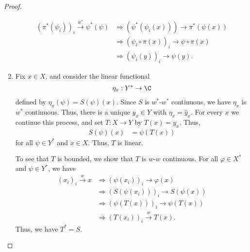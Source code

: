 \documentclass[10pt]{mypackage}
\begin{document}
\begin{proof}
\begin{enumerate}[(1)]
\begin{align*}
        \left(\pi^{\ast}\left(\psi_i\right)\right)_i \xrightarrow{w^{\ast}}\psi^{\ast}\left(\psi\right) &\Rightarrow \left(\psi^{\ast}\left(\psi_{i}\left(x\right)\right)\right) \rightarrow \pi^{\ast}\left(\psi\left(x\right)\right)\\
                                                                                                        &\Rightarrow \left(\psi_i\circ\pi\left(x\right)\right)_i \rightarrow \psi\circ \pi\left(x\right)\\
                                                                                                        &\Rightarrow \left(\psi_i\left(y\right)\right)_i \rightarrow \psi\left(y\right).
      \end{align*}
    \item Fix $x\in X$, and consider the linear functional
      \begin{align*}
        \eta_x: Y^{\ast}\rightarrow \C
      \end{align*}
      defined by $\eta_x\left(\psi\right) = S\left(\psi\right)\left(x\right)$. Since $S$ is $w^{\ast}$-$w^{\ast}$ continuous, we have $\eta_x$ is $w^{\ast}$ continuous. Thus, there is a unique $y_x\in Y$ with $\eta_x = \hat{y}_x$. For every $x$ we continue this process, and set $T: X\rightarrow Y$ by $T(x) = y_x$. Thus,
      \begin{align*}
        S\left(\psi\right)\left(x\right) &= \psi\left(T\left(x\right)\right)
      \end{align*}
      for all $\psi\in Y^{\ast}$ and $x\in X$. Thus, $T$ is linear.\newline

      To see that $T$ is bounded, we show that $T$ is $w$-$w$ continuous. For all $\varphi\in X^{\ast}$ and $\psi\in Y^{\ast}$, we have
      \begin{align*}
        \left(x_i\right)_i\xrightarrow{w}x &\Rightarrow \left(\psi\left(x_i\right)\right)_i \rightarrow\varphi\left(x\right)\\
                                           &\Rightarrow \left(S\left(\psi\left(x_i\right)\right)\right)_i \rightarrow S\left(\psi\left(x\right)\right)\\
                                           &\Rightarrow \left(\psi\left(T\left(x\right)\right)\right)_i\rightarrow \psi\left(T\left(x\right)\right)\\
                                           &\Rightarrow \left(T\left(x_i\right)\right)_i\xrightarrow{w}T\left(x\right).
      \end{align*}
      Thus, we have $T^{\ast} = S$.
  \end{enumerate}
\end{proof}
\end{document}
